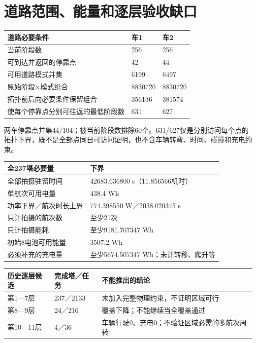 \section*{道路范围、能量和逐层验收缺口}
\begin{center}\small\begin{tabular}{p{99mm}p{29mm}p{29mm}}\toprule 道路必要条件 & 车1 & 车2\\\midrule
当前阶段数 & 256 & 256\\
可到达并返回的停靠点 & 42 & 44\\
可用道路模式并集 & 6199 & 6497\\
原始阶段×模式组合 & 8830720 & 8830720\\
拓扑前后向必要条件保留组合 & 356136 & 381574\\
使每个停靠点分别可往返的最低阶段数 & 631 & 627\\
\bottomrule\end{tabular}\end{center}\small 两车停靠点并集44/104；被当前阶段数排除60个。631/627仅是分别访问每个点的拓扑下界，既不是全部点同日可访问证明，也不含车辆转弯、时间、碰撞和充电约束。\par\begin{center}\small\begin{tabular}{p{99mm}p{58mm}}\toprule 全237塔必要量 & 下界\\\midrule
全部拍摄驻留时间 & 42683.636800 s（11.856566机时）\\
单航次可用电量 & 438.4 Wh\\
功率下界／航次时长上界 & 774.398550 W／2038.020345 s\\
只计拍摄的航次数 & 至少21次\\
只计拍摄能耗 & 至少9181.707347 Wh\\
初始8电池可用能量 & 3507.2 Wh\\
必须补充的充电量 & 至少5674.507347 Wh；未计转移、爬升等\\
\bottomrule\end{tabular}\end{center}\begin{center}\small\begin{tabular}{p{36mm}p{35mm}p{86mm}}\toprule 历史逐层候选 & 完成塔／任务 & 不能推出的结论\\\midrule
第1—7层 & 237／2133 & 未加入完整物理约束，不证明区域可行\\
第8—9层 & 24／216 & 覆盖下降；不能继续当全覆盖通过\\
第10—11层 & 4／36 & 车辆行驶0、充电0；不验证区域必需的多航次周转\\
\bottomrule\end{tabular}\end{center}
\clearpage
